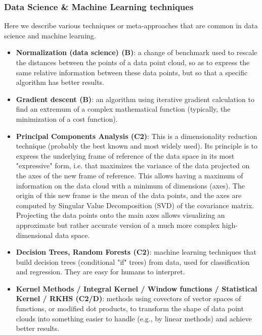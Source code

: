 \documentclass{article}
\begin{document}
\subsubsection*{Data Science \& Machine Learning techniques}

Here we describe various techniques or meta-approaches that are common in data science and machine learning.

\begin{itemize}
    \item \textbf{Normalization (data science) (B)}: a change of benchmark used to rescale the distances between the points of a data point cloud, so as to express the same relative information between these data points, but so that a specific algorithm has better results.

    \item \textbf{Gradient descent (B)}: an algorithm using iterative gradient calculation to find an extremum of a complex mathematical function (typically, the minimization of a cost function).

    \item \textbf{Principal Components Analysis (C2)}: This is a dimensionality reduction technique (probably the best known and most widely used). Its principle is to express the underlying frame of reference of the data space in its most "expressive" form, i.e. that maximizes the variance of the data projected on the axes of the new frame of reference. This allows having a maximum of information on the data cloud with a minimum of dimensions (axes). The origin of this new frame is the mean of the data points, and the axes are computed by Singular Value Decomposition (SVD) of the covariance matrix. Projecting the data points onto the main axes allows visualizing an approximate but rather accurate version of a much more complex high-dimensional data space.

    \item \textbf{Decision Trees, Random Forests (C2)}: machine learning techniques that build decision trees (conditional "if" trees) from data, used for classification and regression. They are easy for humans to interpret.
    
    \item \textbf{Kernel Methods / Integral Kernel / Window functions / Statistical Kernel / RKHS (C2/D)}: methods using covectors of vector spaces of functions, or modified dot products, to transform the shape of data point clouds into something easier to handle (e.g., by linear methods) and achieve better results.


\end{itemize}
\end{document}
